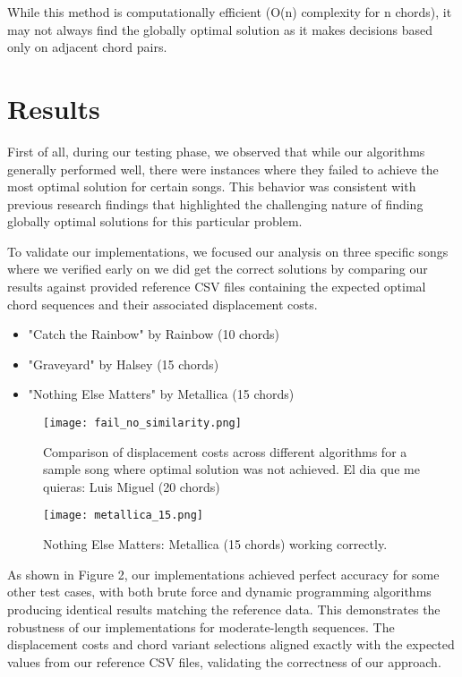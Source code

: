 \documentclass[lettersize,journal]{IEEEtran}
\begin{document}
While this method is computationally efficient (O(n) complexity for n chords), it may not always find the globally optimal solution as it makes decisions based only on adjacent chord pairs.

\section{Results}
\noindent First of all, during our testing phase, we observed that while our algorithms generally performed well, there were instances where they failed to achieve the most optimal solution for certain songs. This behavior was consistent with previous research findings that highlighted the challenging nature of finding globally optimal solutions for this particular problem.

To validate our implementations, we focused our analysis on three specific songs where we verified early on we did get the correct solutions by comparing our results against provided reference CSV files containing the expected optimal chord sequences and their associated displacement costs.

\begin{itemize}
    \item "Catch the Rainbow" by Rainbow (10 chords)
    \item "Graveyard" by Halsey (15 chords)
    \item "Nothing Else Matters" by Metallica (15 chords)
\end{itemize}

\begin{figure}[h!]
    \centering
    \texttt{[image: fail\_no\_similarity.png]}
    \caption{Comparison of displacement costs across different algorithms for a sample song where optimal solution was not achieved. El dia que me quieras: Luis Miguel (20 chords)}
\end{figure}

\begin{figure}[h!]
    \centering
    \texttt{[image: metallica\_15.png]}
    \caption{Nothing Else Matters: Metallica (15 chords) working correctly.} 
\end{figure}

As shown in Figure 2, our implementations achieved perfect accuracy for some other test cases, with both brute force and dynamic programming algorithms producing identical results matching the reference data. This demonstrates the robustness of our implementations for moderate-length sequences. The displacement costs and chord variant selections aligned exactly with the expected values from our reference CSV files, validating the correctness of our approach.
\end{document}

